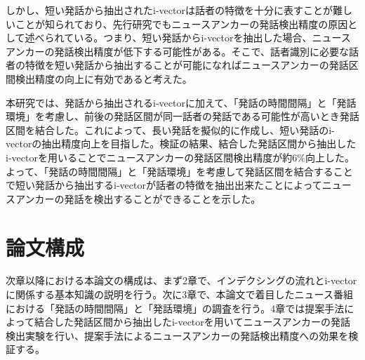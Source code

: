 しかし、短い発話から抽出されたi-vectorは話者の特徴を十分に表すことが難しいことが知られており\cite{panaiv}、先行研究\cite{nozaki_gakuseikai}でもニュースアンカーの発話検出精度の原因として述べられている。つまり、短い発話からi-vectorを抽出した場合、ニュースアンカーの発話検出精度が低下する可能性がある。そこで、話者識別に必要な話者の特徴を短い発話から抽出することが可能になればニュースアンカーの発話区間検出精度の向上に有効であると考えた。\par
本研究では、発話から抽出されるi-vectorに加えて、「発話の時間間隔」と「発話環境」を考慮し、前後の発話区間が同一話者の発話である可能性が高いとき発話区間を結合した。これによって、長い発話を擬似的に作成し、短い発話のi-vectorの抽出精度向上を目指した。検証の結果、結合した発話区間から抽出したi-vectorを用いることでニュースアンカーの発話区間検出精度が約6\%向上した。よって、「発話の時間間隔」と「発話環境」を考慮して発話区間を結合することで短い発話から抽出するi-vectorが話者の特徴を抽出出来たことによってニュースアンカーの発話を検出することができることを示した。

\section{論文構成}
次章以降における本論文の構成は、まず2章で、インデクシングの流れとi-vectorに関係する基本知識の説明を行う。次に3章で、本論文で着目したニュース番組における「発話の時間間隔」と「発話環境」の調査を行う。4章では提案手法によって結合した発話区間から抽出したi-vectorを用いてニュースアンカーの発話検出実験を行い、提案手法によるニュースアンカーの発話検出精度への効果を検証する。
